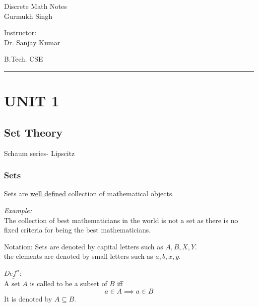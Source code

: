 \documentclass[11pt,letterpaper]{article}
\newenvironment{example}                             
        {\textit{Example:}\\}
	{}
\newenvironment{definition}
	{\begin{mdframed}$\underline{\textit{Def}^\textit{n}:} $\\}
	{\end{mdframed}}
\begin{document}
\begin{center}
  \Huge{Discrete Math Notes}\\
  \vspace{0.25cm}
  \small{Gurmukh Singh}
\end{center}

\vspace{-1.75cm}

\begin{flushright}
  Instructor: \\ Dr. Sanjay Kumar
\end{flushright}

\vspace{-1.3cm}

\begin{flushleft}
  B.Tech. CSE
\end{flushleft}

\rule{15.5cm}{0.1mm}%

\tableofcontents
\pagebreak


\section{UNIT 1}
\subsection{Set Theory}
Schaum series- Lipscitz

\subsubsection{Sets}
Sets are \underline{well defined} collection of mathematical objects.

\begin{example}
  The collection of best mathematicians in the world is not a set as there is no fixed criteria for being the best mathematicians.
\end{example}

Notation: Sets are denoted by capital letters such as $A,B,X,Y$. \\
the elements are denoted by small letters such as $a,b,x,y$. 

\begin{definition}
  A set $A$ is called to be a subset of $B$ iff
  \[
    a \in A \implies a \in B
  \]
  It is denoted by $A \subseteq B$.
\end{definition}
\end{document}
